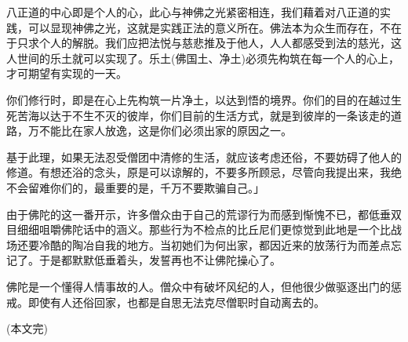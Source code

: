 \documentclass[twoside,openany]{book}
\begin{document}
八正道的中心即是个人的心，此心与神佛之光紧密相连，我们藉着对八正道的实践，可以显现神佛之光，这就是实践正法的意义所在。佛法本为众生而存在，不在于只求个人的解脱。我们应把法悦与慈悲推及于他人，人人都感受到法的慈光，这人世间的乐土就可以实现了。乐土(佛国土、净土)必须先构筑在每一个人的心上，才可期望有实现的一天。

你们修行时，即是在心上先构筑一片净土，以达到悟的境界。你们的目的在越过生死苦海以达于不生不灭的彼岸，你们目前的生活方式，就是到彼岸的一条该走的道路，万不能比在家人放逸，这是你们必须出家的原因之一。

基于此理，如果无法忍受僧团中清修的生活，就应该考虑还俗，不要妨碍了他人的修道。有想还浴的念头，原是可以谅解的，不要多所顾忌，尽管向我提出来，我绝不会留难你们的，最重要的是，千万不要欺骗自己。」

由于佛陀的这一番开示，许多僧众由于自己的荒谬行为而感到惭愧不已，都低垂双目细细咀嚼佛陀话中的涵义。那些行为不检点的比丘尼们更惊觉到此地是一个比战场还要冷酷的陶冶自我的地方。当初她们为何出家，都因近来的放荡行为而差点忘记了。于是都默默低垂着头，发誓再也不让佛陀操心了。

佛陀是一个懂得人情事故的人。僧众中有破坏风纪的人，但他很少做驱逐出门的惩戒。即使有人还俗回家，也都是自思无法克尽僧职时自动离去的。

(本文完)
\end{document}
